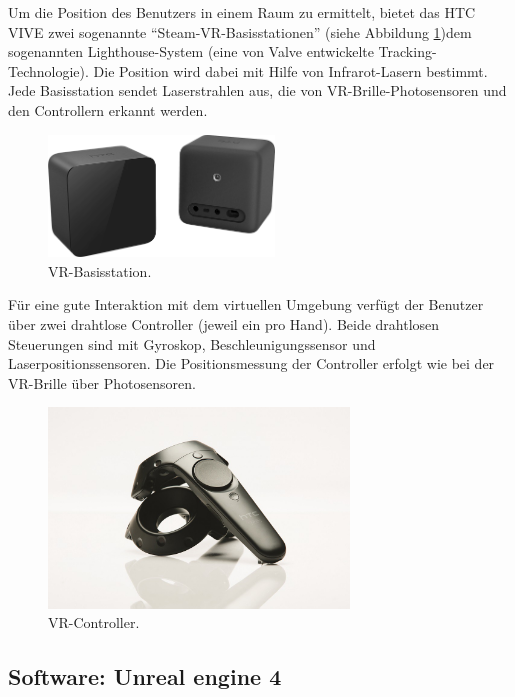 Um die Position des Benutzers in einem Raum zu ermittelt, bietet das HTC VIVE zwei sogenannte ``Steam-VR-Basisstationen'' (siehe Abbildung \ref{vr-base})dem sogenannten Lighthouse-System (eine von Valve entwickelte Tracking-Technologie). 
Die Position wird dabei mit Hilfe von Infrarot-Lasern bestimmt. 
Jede Basisstation sendet Laserstrahlen aus, die von VR-Brille-Photosensoren und den Controllern erkannt werden. \\


\begin{figure}[h] \centering
\includegraphics[width=6cm]{Images/vr-base.png} 
\caption[VR-Basisstation]{ VR-Basisstation\cite{vive19}. }
\label{vr-base} 
\end{figure}


F{\"u}r eine gute Interaktion mit dem virtuellen Umgebung verf{\"u}gt der Benutzer {\"u}ber zwei  drahtlose Controller (jeweil ein pro Hand). 
Beide drahtlosen Steuerungen sind mit Gyroskop, Beschleunigungssensor und Laserpositionssensoren. 
Die Positionsmessung der Controller erfolgt wie bei der VR-Brille {\"u}ber  Photosensoren. \\


\begin{figure}[h] \centering
\includegraphics[width=8cm]{Images/vr-controller.png} 
\caption[VR-Controller]{ VR-Controller\cite{vive19}. }
\label{vr-controller} 
\end{figure}




\subsection{Software: Unreal engine 4} \label{vr-software}


